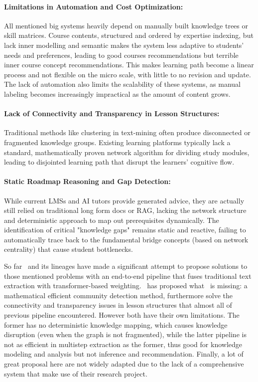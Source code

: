 \paragraph*{{Limitations in Automation and Cost Optimization:}} All mentioned big systems heavily depend on manually built knowledge trees or skill matrices. Course contents, 
structured and ordered by expertise indexing, but lack inner modelling and semantic makes the system less adaptive to students' needs and preferences, 
leading to good courses recommendations but terrible inner course concept recommendations.
This makes learning path become a linear process and not flexible on the micro scale, with little to no revision and update. 
The lack of automation also limits the scalability of these systems, as manual labeling becomes increasingly impractical as the amount of content grows.
\paragraph*{{Lack of Connectivity and Transparency in Lesson Structures:}} Traditional methods like clustering in text-mining often produce disconnected 
or fragmented knowledge groups. Existing learning platforms typically lack a standard, mathematically proven network algorithm for dividing study modules, leading 
to disjointed learning path that disrupt the learners' cognitive flow.
    
\paragraph*{{Static Roadmap Reasoning and Gap Detection:}} While current LMSs and AI tutors provide generated advice, they are actually still relied on traditional long 
form docs or RAG, lacking the network structure and deterministic approach to map out prerequisites dynamically. The identification of critical "knowledge gaps" remains 
static and reactive, failing to automatically trace back to the fundamental bridge concepts (based on network centrality) that cause student bottlenecks.

So far~\cite{EduKGPipe} and its lineages have made a significant attempt to propose solutions to those mentioned problems with an 
end-to-end pipeline that fuses traditional text extraction with transformer-based weighting.~\cite{DKG} has proposed what~\cite{EduKGPipe} is missing: a mathematical 
efficient community detection method, furthermore solve the connectivity and transparency issues in lesson structures that almost all of previous pipeline encountered. 
However both have their own limitations. The former has no deterministic knowledge mapping, which causes knowledge disruption (even when the graph is not fragmented), 
while the latter pipeline is not as efficient in multistep extraction as the former, thus good for knowledge modeling and analysis but not inference and recommendation. 
Finally, a lot of great proposal here are not widely adapted due to the lack of a comprehensive system that make use of their research project. 

